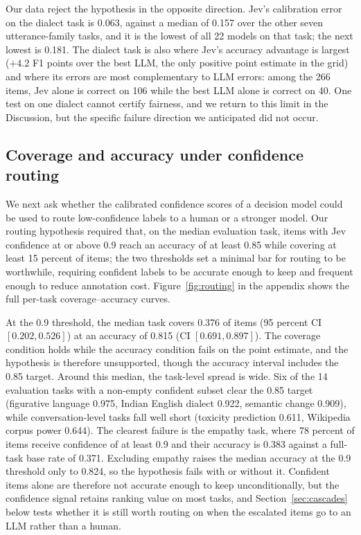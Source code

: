 \documentclass[11pt]{article}
\begin{document}
Our data reject the hypothesis in the opposite direction. Jev's calibration error on the dialect task is 0.063, against a median of 0.157 over the other seven utterance-family tasks, and it is the lowest of all 22 models on that task; the next lowest is 0.181. The dialect task is also where Jev's accuracy advantage is largest ($+4.2$ F1 points over the best LLM, the only positive point estimate in the grid) and where its errors are most complementary to LLM errors: among the 266 items, Jev alone is correct on 106 while the best LLM alone is correct on 40. One test on one dialect cannot certify fairness, and we return to this limit in the Discussion, but the specific failure direction we anticipated did not occur.

\subsection{Coverage and accuracy under confidence routing}

We next ask whether the calibrated confidence scores of a decision model could be used to route low-confidence labels to a human or a stronger model. Our routing hypothesis required that, on the median evaluation task, items with Jev confidence at or above 0.9 reach an accuracy of at least 0.85 while covering at least 15 percent of items; the two thresholds set a minimal bar for routing to be worthwhile, requiring confident labels to be accurate enough to keep and frequent enough to reduce annotation cost. Figure~\ref{fig:routing} in the appendix shows the full per-task coverage--accuracy curves.

At the 0.9 threshold, the median task covers 0.376 of items (95 percent CI $[0.202, 0.526]$) at an accuracy of 0.815 (CI $[0.691, 0.897]$). The coverage condition holds while the accuracy condition fails on the point estimate, and the hypothesis is therefore unsupported, though the accuracy interval includes the 0.85 target. Around this median, the task-level spread is wide. Six of the 14 evaluation tasks with a non-empty confident subset clear the 0.85 target (figurative language 0.975, Indian English dialect 0.922, semantic change 0.909), while conversation-level tasks fall well short (toxicity prediction 0.611, Wikipedia corpus power 0.644). The clearest failure is the empathy task, where 78 percent of items receive confidence of at least 0.9 and their accuracy is 0.383 against a full-task base rate of 0.371. Excluding empathy raises the median accuracy at the 0.9 threshold only to 0.824, so the hypothesis fails with or without it. Confident items alone are therefore not accurate enough to keep unconditionally, but the confidence signal retains ranking value on most tasks, and Section~\ref{sec:cascades} below tests whether it is still worth routing on when the escalated items go to an LLM rather than a human.
\end{document}
